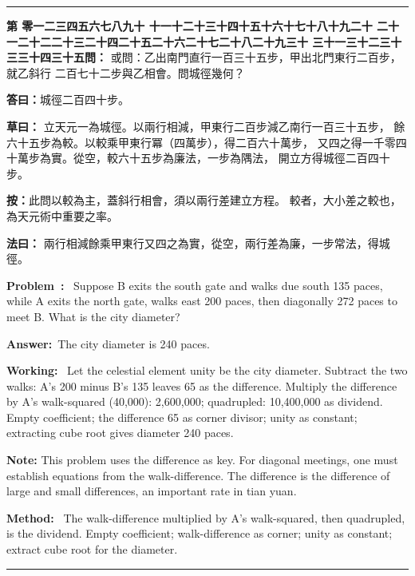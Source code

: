 \documentclass[9pt,a4paper]{article}
\newcounter{probnum}
\newcounter{overallnum}
\newcommand{\chnum}[1]{%
  \ifcase#1 零\or 一\or 二\or 三\or 四\or 五\or 六\or 七\or 八\or 九\or 十\or
    十一\or 十二\or 十三\or 十四\or 十五\or 十六\or 十七\or 十八\or 十九\or 二十\or
    二十一\or 二十二\or 二十三\or 二十四\or 二十五\or 二十六\or 二十七\or 二十八\or 二十九\or 三十\or
    三十一\or 三十二\or 三十三\or 三十四\or 三十五\fi}
\newcommand{\problem}[1]{\stepcounter{probnum}\stepcounter{overallnum}\par\noindent\textbf{\color{volcolor}第\chnum{\value{probnum}}問：}#1\par\vspace{0.15cm}}
\newcommand{\answer}[1]{\par\noindent\textbf{答曰：}#1\par\vspace{0.15cm}}
\newcommand{\working}[1]{\par\noindent\textbf{草曰：}#1\par\vspace{0.15cm}}
\newcommand{\method}[1]{\par\noindent\textbf{法曰：}#1\par\vspace{0.25cm}}
\newcommand{\eproblem}[1]{\par\noindent\textbf{\color{volcolor}Problem~\theoverallnum:}~#1\par\vspace{0.15cm}}
\newcommand{\eanswer}[1]{\par\noindent\textbf{Answer:}~#1\par\vspace{0.15cm}}
\newcommand{\eworking}[1]{\par\noindent\textbf{Working:}~#1\par\vspace{0.15cm}}
\newcommand{\emethod}[1]{\par\noindent\textbf{Method:}~#1\par\vspace{0.25cm}}
\begin{document}
\vspace{0.15cm}
\noindent\rule{\textwidth}{0.2pt}
\vspace{0.15cm}

\noindent\begin{minipage}[t]{0.48\textwidth}
\problem{
或問：乙出南門直行一百三十五步，甲出北門東行二百步，就乙斜行
二百七十二步與乙相會。問城徑幾何？
}

\answer{城徑二百四十步。}

\working{
立天元一為城徑。以兩行相減，甲東行二百步減乙南行一百三十五步，
餘六十五步為較。以較乘甲東行冪（四萬步），得二百六十萬步，
又四之得一千零四十萬步為實。從空，較六十五步為廉法，一步為隅法，
開立方得城徑二百四十步。

\textbf{按：}此問以較為主，蓋斜行相會，須以兩行差建立方程。
較者，大小差之較也，為天元術中重要之率。
}

\method{
兩行相減餘乘甲東行又四之為實，從空，兩行差為廉，一步常法，得城徑。
}
\end{minipage}%
\hfill%
\begin{minipage}[t]{0.50\textwidth}
\eproblem{
Suppose B exits the south gate and walks due south 135 paces, while A exits
the north gate, walks east 200 paces, then diagonally 272 paces to meet B.
What is the city diameter?
}

\eanswer{The city diameter is 240 paces.}

\eworking{
Let the celestial element unity be the city diameter. Subtract the two walks:
A's 200 minus B's 135 leaves 65 as the difference. Multiply the difference by
A's walk-squared (40,000): 2,600,000; quadrupled: 10,400,000 as dividend.
Empty coefficient; the difference 65 as corner divisor; unity as constant;
extracting cube root gives diameter 240 paces.

\textbf{Note:} This problem uses the difference as key. For diagonal meetings,
one must establish equations from the walk-difference. The difference is the
difference of large and small differences, an important rate in tian yuan.
}

\emethod{
The walk-difference multiplied by A's walk-squared, then quadrupled, is the
dividend. Empty coefficient; walk-difference as corner; unity as constant;
extract cube root for the diameter.
}
\end{minipage}
\vspace{0.15cm}

\vspace{0.15cm}
\noindent\rule{\textwidth}{0.2pt}
\vspace{0.15cm}
\end{document}
